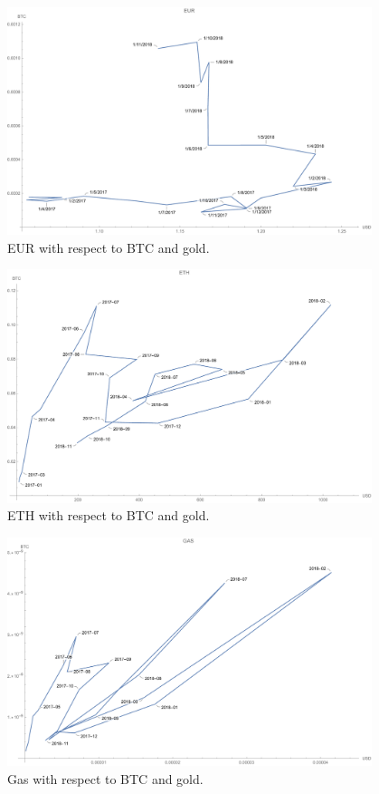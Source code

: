 
\begin{figure}[!htb]
	\centering
	\includegraphics[width=0.95\textwidth]{figures/eur.pdf}
	\caption{\label{fig:eur} EUR with respect to BTC and gold.}
\end{figure}

\begin{figure}[!htb]
	\centering
	\includegraphics[width=0.95\textwidth]{figures/eth.pdf}
	\caption{\label{fig:eth} ETH with respect to BTC and gold.}
\end{figure}

\begin{figure}[!htb]
	\centering
	\includegraphics[width=0.95\textwidth]{figures/gas.pdf}
	\caption{\label{fig:gas} Gas with respect to BTC and gold.}
\end{figure}



